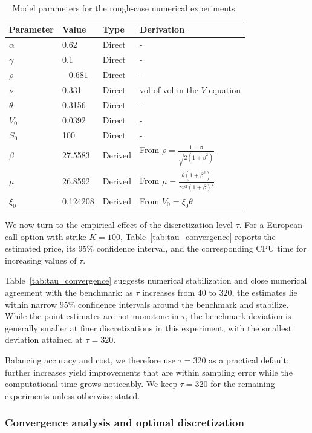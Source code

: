 \documentclass[letterpaper]{article}
\numberwithin{equation}{section}
\theoremstyle{definition}
\theoremstyle{remark}
\begin{document}
\begin{table}[ht]
\centering
\caption{Model parameters for the rough-case numerical experiments.}
\small
\setlength{\tabcolsep}{6pt}
\begin{tabular}{llll}
\toprule
Parameter & Value & Type & Derivation \\
\midrule
$\alpha$ & 0.62 & Direct & - \\
$\gamma$ & 0.1 & Direct & - \\
$\rho$ & $-0.681$ & Direct & - \\
$\nu$ & 0.331 & Direct & vol-of-vol in the $V$-equation \\
$\theta$ & 0.3156 & Direct & - \\
$V_0$ & 0.0392 & Direct & - \\
$S_0$ & 100 & Direct & - \\
\midrule
$\beta$ & 27.5583 & Derived & From $\displaystyle \rho=\frac{1-\beta}{\sqrt{2(1+\beta^2)}}$ \\
$\mu$ & 26.8592 & Derived & From $\displaystyle \mu=\frac{\theta(1+\beta^2)}{\gamma\nu^2(1+\beta)^2}$ \\
$\xi_0$ & 0.124208 & Derived & From $\displaystyle V_0=\xi_0\theta$ \\
\bottomrule
\end{tabular}
\label{tab:all_params}
\end{table}

We now turn to the empirical effect of the discretization level $\tau$. For a European call option with strike $K=100$, Table~\ref{tab:tau_convergence} reports the estimated price, its 95\% confidence interval, and the corresponding CPU time for increasing values of $\tau$.

Table~\ref{tab:tau_convergence} suggests numerical stabilization and close numerical agreement with the benchmark:
as $\tau$ increases from $40$ to $320$, the estimates lie within narrow $95\%$
confidence intervals around the benchmark and stabilize. {While the point estimates are not monotone in $\tau$, the benchmark deviation is generally smaller at finer discretizations in this experiment, with the smallest deviation attained at $\tau=320$.}

Balancing accuracy and cost, we therefore use $\tau=320$ as a practical default:
further increases yield improvements that are within sampling error while the
computational time grows noticeably. We keep $\tau=320$ for the remaining experiments
unless otherwise stated.

\subsubsection{Convergence analysis and optimal discretization}
\label{sec:convergence_analysis}
\end{document}

